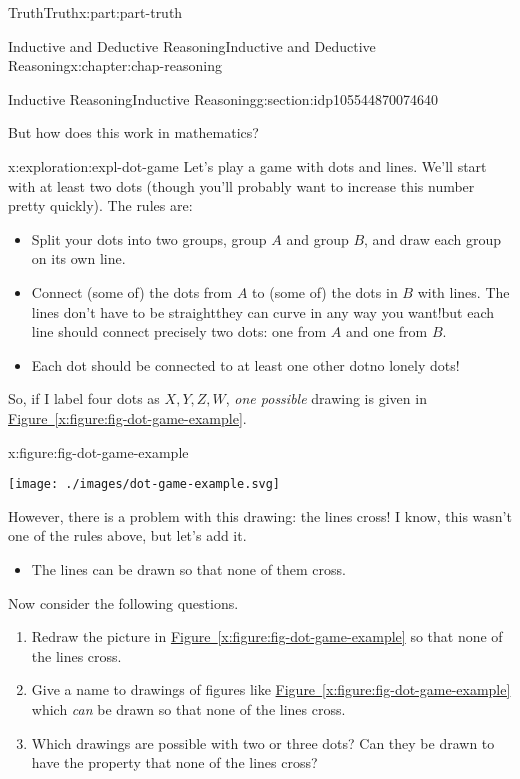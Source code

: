 \documentclass[oneside,10pt,]{book}
\newcommand{\xreffont}{\relax}
\numberwithin{equation}{section}
\begin{document}
\begin{partptx}{Truth}{}{Truth}{}{}{x:part:part-truth}
\begin{chapterptx}{Inductive and Deductive Reasoning}{}{Inductive and Deductive Reasoning}{}{}{x:chapter:chap-reasoning}
\begin{sectionptx}{Inductive Reasoning}{}{Inductive Reasoning}{}{}{g:section:idp105544870074640}
\par
But how does this work in mathematics?%
\begin{exploration}{}{x:exploration:expl-dot-game}%
Let's play a game with dots and lines. We'll start with at least two dots (though you'll probably want to increase this number pretty quickly). The rules are:%
%
\begin{itemize}[label=\textbullet]
\item{}Split your dots into two groups, group \(A\) and group \(B\), and draw each group on its own line.%
\item{}Connect (some of) the dots from \(A\) to (some of) the dots in \(B\) with lines. The lines don't have to be straight\textemdash{}they can curve in any way you want!\textemdash{}but each line should connect precisely two dots: one from \(A\) and one from \(B\).%
\item{}Each dot should be connected to at least one other dot\textemdash{}no lonely dots!%
\end{itemize}
So, if I label four dots as \(X, Y, Z, W\), \emph{one possible} drawing is given in \hyperref[x:figure:fig-dot-game-example]{Figure~{\xreffont\ref{x:figure:fig-dot-game-example}}}.%
\begin{figureptx}{}{x:figure:fig-dot-game-example}{}%
\begin{image}{0.325}{0.35}{0.325}%
\texttt{[image: ./images/dot-game-example.svg]}
\end{image}%
\tcblower
\end{figureptx}%
However, there is a problem with this drawing: the lines cross! I know, this wasn't one of the rules above, but let's add it.%
%
\begin{itemize}[label=\textbullet]
\item{}The lines can be drawn so that none of them cross.%
\end{itemize}
Now consider the following questions.%
%
\begin{enumerate}
\item{}Redraw the picture in \hyperref[x:figure:fig-dot-game-example]{Figure~{\xreffont\ref{x:figure:fig-dot-game-example}}} so that none of the lines cross.%
\item{}Give a name to drawings of figures like \hyperref[x:figure:fig-dot-game-example]{Figure~{\xreffont\ref{x:figure:fig-dot-game-example}}} which \emph{can} be drawn so that none of the lines cross.%
\item{}Which drawings are possible with two or three dots? Can they be drawn to have the property that none of the lines cross?%

\end{enumerate}
\end{exploration}
\end{sectionptx}
\end{chapterptx}
\end{partptx}
\end{document}
